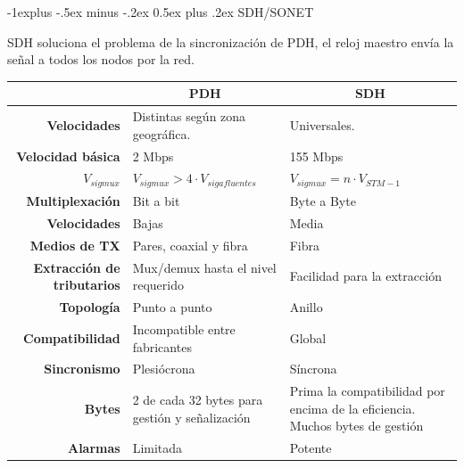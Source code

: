 \documentclass[10pt,portrait, twocolumn]{article}
\makeatletter
\renewcommand{\subsection}{\@startsection{subsection}{2}{0mm}%
                                {-1explus -.5ex minus -.2ex}%
                                {0.5ex plus .2ex}%
                                {\normalfont\normalsize\bfseries}}
\makeatother
\begin{document}
\subsection{SDH/SONET}

SDH soluciona el problema de la sincronización de PDH, el reloj maestro envía la señal a todos los nodos por la red.

\begin{tabular}{|r|l|l|}
\hline
                                   & \multicolumn{1}{c|}{\textbf{PDH}}              & \multicolumn{1}{c|}{\textbf{SDH}}                                            \\ \hline
\textbf{Velocidades}               & Distintas según zona geográfica.               & Universales.                                                                 \\ \hline
\textbf{Velocidad básica}          & 2 Mbps                                         & 155 Mbps                                                                     \\ \hline
\textbf{$V_{sig mux}$}             & $V_{sig mux} > 4 \cdot V_{sig afluentes}$      & $V_{sig mux} = n \cdot V_{STM-1}$                                            \\ \hline
\textbf{Multiplexación}            & Bit a bit                                      & Byte a Byte                                                                  \\ \hline
\textbf{Velocidades}               & Bajas                                          & Media                                                                        \\ \hline
\textbf{Medios de TX}              & Pares, coaxial y fibra                         & Fibra                                                                        \\ \hline
\textbf{Extracción de tributarios} & Mux/demux hasta el nivel requerido             & Facilidad para la extracción                                                 \\ \hline
\textbf{Topología}                 & Punto a punto                                  & Anillo                                                                       \\ \hline
\textbf{Compatibilidad}            & Incompatible entre fabricantes                 & Global                                                                       \\ \hline
\textbf{Sincronismo}               & Plesiócrona                                    & Síncrona                                                                     \\ \hline
\textbf{Bytes}                     & 2 de cada 32 bytes para gestión y señalización & Prima la compatibilidad por encima de la eficiencia. Muchos bytes de gestión \\ \hline
\textbf{Alarmas}                   & Limitada                                       & Potente                                                                      \\ \hline
\end{tabular}
\end{document}
